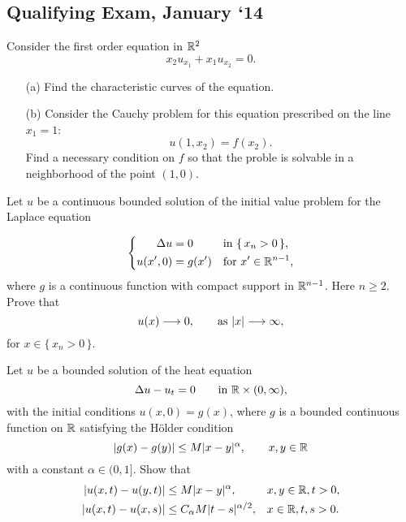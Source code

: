 \subsection{Qualifying Exam, January `14}
\begin{problem}
  Consider the first order equation in \(\mathbb{R}^2\)
  \[
    x_2u_{x_1}+x_1u_{x_2}=0.
  \]
  \begin{itemize}[noitemsep]
  \item[(a)] Find the characteristic curves of the equation.
  \item[(b)] Consider the Cauchy problem for this equation prescribed on
    the line \(x_1=1\):
    \[
      u(1,x_2)=f(x_2).
    \]
    Find a necessary condition on \(f\) so that the proble is solvable in a
    neighborhood of the point \((1,0)\).
  \end{itemize}
\end{problem}
\begin{solution}
\end{solution}

\begin{problem}
  Let \(u\) be a continuous bounded solution of the initial value problem
  for the Laplace equation

  \[
    \left\{
      \begin{aligned}
        \Delta u&=0&&\text{in \(\{\,x_n>0\,\}\),}\\
        u(x',0)&=g(x')&&\text{for \(x'\in\mathbb{R}^{n-1}\),}
      \end{aligned}
    \right.
  \]
  where \(g\) is a continuous function with compact support in
  \(\mathbb{R}^{n-1}\). Here \(n\geq 2\). Prove that
  \[
    u(x)\To 0,\qquad%
    \text{as } |x|\To \infty,
  \]
  for \(x\in\{\,x_n>0\,\}\).
\end{problem}
\begin{solution}
\end{solution}

\begin{problem}
  Let \(u\) be a bounded solution of the heat equation
  \[
    \Delta u-u_t=0\qquad\text{in \(\mathbb{R}\times(0,\infty)\),}
  \]
  with the initial conditions \(u(x,0)=g(x)\), where \(g\) is a bounded
  continuous function on \(\mathbb{R}\) satisfying the Hölder condition
  \[
    |g(x)-g(y)|\leq M|x-y|^\alpha,\qquad x,y\in\mathbb{R}
  \]
  with a constant \(\alpha\in (0, 1]\). Show that
  \[
    \begin{aligned}
      |u(x,t)-u(y,t)|&\leq M|x-y|^\alpha,&&x,y\in\mathbb{R},t>0,\\
      |u(x,t)-u(x,s)|&\leq C_\alpha M|t-s|^{\alpha/2},&&x\in\mathbb{R},t,s>0.
    \end{aligned}
  \]

  \noindent [\emph{Hint:} For the last inequality, in the representation
  formula of \(u(x,t)\) as a convolution with the heat kernel
  \(\Phi(y,t)\), make a change of variables \(z=y/\sqrt{t}\) and use that
  $\left|\sqrt{t}-\sqrt{s}\right|\leq\sqrt{|t-s|}$.]
\end{problem}
\begin{solution}
\end{solution}

